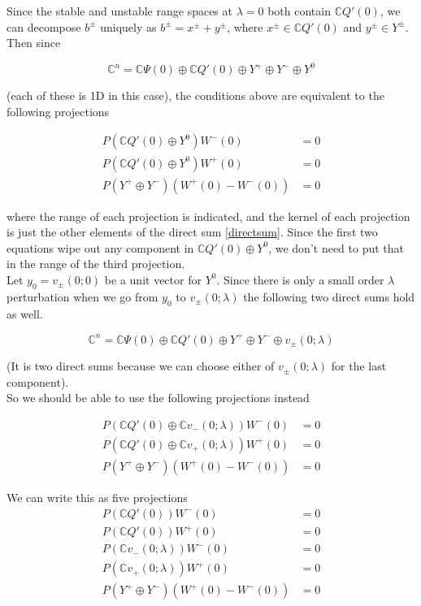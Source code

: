 \documentclass[12pt]{article}
\def\C{{\mathbb C}}
\begin{document}
\begin{enumerate}
Since the stable and unstable range spaces at $\lambda = 0$ both contain $\C Q'(0)$, we can decompose $b^\pm$ uniquely as $b^\pm = x^\pm + y^\pm$, where $x^\pm \in \C Q'(0)$ and $y^\pm \in Y^\pm$. Then since

\begin{equation}\label{directsum}
\C^n = \C\Psi(0) \oplus \C Q'(0) \oplus Y^+ \oplus Y^- \oplus Y^0
\end{equation}

(each of these is 1D in this case), the conditions above are equivalent to the following projections

\begin{align*}
P(\C Q'(0) \oplus Y^0 )W^-(0) &= 0 \\
P(\C Q'(0) \oplus Y^0 )W^+(0) &= 0 \\
P(Y^+ \oplus Y^-) (W^+(0) - W^-(0) ) &= 0
\end{align*}

where the range of each projection is indicated, and the kernel of each projection is just the other elements of the direct sum \eqref{directsum}. Since the first two equations wipe out any component in $\C Q'(0) \oplus Y^0$, we don't need to put that in the range of the third projection. \\

Let $y_0 = v_\pm(0; 0)$ be a unit vector for $Y^0$. Since there is only a small order $\lambda$ perturbation when we go from $y_0$ to $v_\pm(0; \lambda)$ the following two direct sums hold as well.

\begin{equation}\label{directsum}
\C^n = \C\Psi(0) \oplus \C Q'(0) \oplus Y^+ \oplus Y^- \oplus v_\pm(0; \lambda)
\end{equation}

(It is two direct sums because we can choose either of $v_\pm(0; \lambda)$ for the last component).\\

So we should be able to use the following projections instead

\begin{align*}
P(\C Q'(0) \oplus \C v_-(0; \lambda) )W^-(0) &= 0 \\
P(\C Q'(0) \oplus \C v_+(0; \lambda) )W^+(0) &= 0 \\
P(Y^+ \oplus Y^-) (W^+(0) - W^-(0) ) &= 0
\end{align*}

We can write this as five projections
\begin{align*}
P(\C Q'(0) )W^-(0) &= 0 \\
P(\C Q'(0) )W^+(0) &= 0 \\
P(\C v_-(0; \lambda))W^-(0) &= 0 \\
P(\C v_+(0; \lambda))W^+(0) &= 0 \\
P(Y^+ \oplus Y^-) (W^+(0) - W^-(0) ) &= 0
\end{align*}


\end{enumerate}
\end{document}
